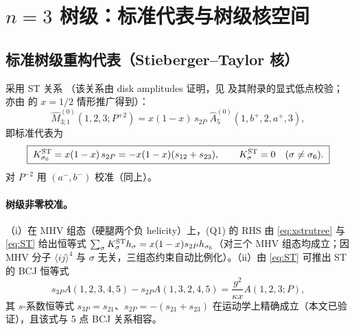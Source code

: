 \documentclass[11pt]{article}
\newcommand{\ab}[1]{\langle #1\rangle}
\newcommand{\Mhat}{\widehat{M}}
\newcommand{\Ahat}{\widehat{A}}
\newcommand{\Pt}{P}
\begin{document}
\section{$n=3$ 树级：标准代表与树级核空间}
\label{sec:tree}

\subsection{标准树级重构代表（Stieberger--Taylor 核）}
采用 ST 关系 \cite{ST2015}（该关系由 disk amplitudes 证明，见 \cite{ST2015} 及其附录的显式低点校验；亦由 \cite{ST2014} 的 $x=1/2$ 情形推广得到）：
\begin{equation}
\Mhat^{(0)}_{3;1}(1,2,3;\Pt^{+2})=x(1-x)\,s_{2\Pt}\;\Ahat^{(0)}_5(1,b^+,2,a^+,3),
\label{eq:ST}
\end{equation}
即标准代表为
\begin{equation}
\boxed{\;K^{\rm ST}_{\sigma_6}=x(1-x)\,s_{2\Pt}=-x(1-x)(s_{12}+s_{23}),\qquad
K^{\rm ST}_{\sigma}=0\quad(\sigma\neq\sigma_6).\;}
\label{eq:KST}
\end{equation}
对 $\Pt^{-2}$ 用 $(a^-,b^-)$ 校准（同上）。

\paragraph{树级非零校准。}（i）在 MHV 组态（硬腿两个负 helicity）上，(Q1) 的 RHS 由 \eqref{eq:xstrutree} 与 \eqref{eq:ST} 给出恒等式
$\sum_\sigma K^{\rm ST}_\sigma h_\sigma=x(1-x)s_{2\Pt}h_{\sigma_6}$（对三个 MHV 组态均成立；因 MHV 分子 $\ab{ij}^4$ 与 $\sigma$ 无关，三组态约束自动比例化）。（ii）由 \eqref{eq:ST} 可推出 ST 的 BCJ 恒等式 \cite{ST2015}
\begin{equation}
s_{3\Pt}A(1,2,3,4,5)-s_{2\Pt}A(1,3,2,4,5)=\frac{g^2}{\kappa x}A(1,2,3;\Pt),
\end{equation}
其 $s$-系数恒等式 $s_{3\Pt}=s_{21}$、$s_{2\Pt}=-(s_{21}+s_{23})$ 在运动学上精确成立（本文已验证），且该式与 5 点 BCJ 关系相容。
\end{document}

